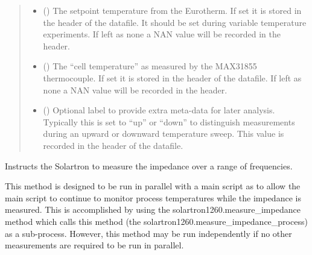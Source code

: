\documentclass[letterpaper,10pt,english]{sphinxmanual}
\begin{document}
\begin{fulllineitems}
\begin{fulllineitems}
\begin{quote}
\begin{description}
\begin{itemize}
\item {} 
 (\sphinxstyleliteralemphasis{\sphinxupquote{, }}) \textendash{} The setpoint temperature from the Eurotherm. If set
it is stored in the header of the datafile. It should be set
during variable temperature experiments. If left as none a NAN
value will be recorded in the header.

\item {} 
 (\sphinxstyleliteralemphasis{\sphinxupquote{, }}) \textendash{} The “cell temperature” as measured by the MAX31855 thermocouple.
If set it is stored in the header of the datafile. If left as none
a NAN value will be recorded in the header.

\item {} 
 (\sphinxstyleliteralemphasis{\sphinxupquote{, }}) \textendash{} Optional label to provide extra meta-data for later analysis.
Typically this is set to “up” or “down” to distinguish measurements
during an upward or downward temperature sweep. This value is
recorded in the header of the datafile.

\end{itemize}

\end{description}\end{quote}

\end{fulllineitems}


\begin{fulllineitems}
\label{\detokenize{vtipy_docs/vtipy:vtipy.impedance.solartron1260.measure_impedance_process}}
Instructs the Solartron to measure the impedance over a range of
frequencies.

This method is designed to be run in parallel with a main script as to
allow the main script to continue to monitor process temperatures
while the impedance is measured. This is accomplished by using the
solartron1260.measure\_impedance method which calls this method (the
solartron1260.measure\_impedance\_process) as a sub-process. However,
this method may be run independently if no other measurements are
required to be run in parallel.


\end{fulllineitems}
\end{fulllineitems}
\end{document}
